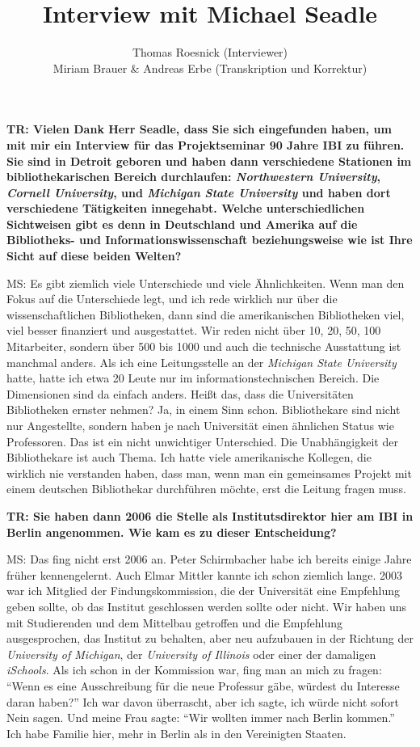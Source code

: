 \documentclass[a4paper,
fontsize=11pt,
oneside,
numbers=noperiodatend,
parskip=half-,
bibliography=totoc,
final
]{scrartcl}
\title{\LARGE{Interview mit Michael Seadle}}%
\author{Thomas Roesnick (Interviewer) \\ Miriam Brauer \& Andreas Erbe (Transkription und Korrektur)} %
\date{}
\begin{document}
\maketitle
\thispagestyle{fancyplain} 


\textbf{TR: Vielen Dank Herr Seadle, dass Sie sich eingefunden haben, um
mit mir ein Interview für das Projektseminar 90 Jahre IBI zu führen. Sie
sind in Detroit geboren und haben dann verschiedene Stationen im
bibliothekarischen Bereich durchlaufen: \emph{Northwestern University},
\emph{Cornell University}, und \emph{Michigan State University} und
haben dort verschiedene Tätigkeiten innegehabt. Welche unterschiedlichen
Sichtweisen gibt es denn in Deutschland und Amerika auf die Bibliotheks-
und Informationswissenschaft beziehungsweise wie ist Ihre Sicht auf
diese beiden Welten?}

MS: Es gibt ziemlich viele Unterschiede und viele Ähnlichkeiten. Wenn
man den Fokus auf die Unterschiede legt, und ich rede wirklich nur über
die wissenschaftlichen Bibliotheken, dann sind die amerikanischen
Bibliotheken viel, viel besser finanziert und ausgestattet. Wir reden
nicht über 10, 20, 50, 100 Mitarbeiter, sondern über 500 bis 1000 und
auch die technische Ausstattung ist manchmal anders. Als ich eine
Leitungsstelle an der \emph{Michigan State University} hatte, hatte ich
etwa 20 Leute nur im informationstechnischen Bereich. Die Dimensionen
sind da einfach anders. Heißt das, dass die Universitäten Bibliotheken
ernster nehmen? Ja, in einem Sinn schon. Bibliothekare sind nicht nur
Angestellte, sondern haben je nach Universität einen ähnlichen Status
wie Professoren. Das ist ein nicht unwichtiger Unterschied. Die
Unabhängigkeit der Bibliothekare ist auch Thema. Ich hatte viele
amerikanische Kollegen, die wirklich nie verstanden haben, dass man,
wenn man ein gemeinsames Projekt mit einem deutschen Bibliothekar
durchführen möchte, erst die Leitung fragen muss.

\textbf{TR: Sie haben dann 2006 die Stelle als Institutsdirektor hier am
IBI in Berlin angenommen. Wie kam es zu dieser Entscheidung?}

MS: Das fing nicht erst 2006 an. Peter Schirmbacher habe ich bereits
einige Jahre früher kennengelernt. Auch Elmar Mittler kannte ich schon
ziemlich lange. 2003 war ich Mitglied der Findungskommission, die der
Universität eine Empfehlung geben sollte, ob das Institut geschlossen
werden sollte oder nicht. Wir haben uns mit Studierenden und dem
Mittelbau getroffen und die Empfehlung ausgesprochen, das Institut zu
behalten, aber neu aufzubauen in der Richtung der \emph{University of
Michigan}, der \emph{University of Illinois} oder einer der damaligen
\emph{iSchools}. Als ich schon in der Kommission war, fing man an mich
zu fragen: \enquote{Wenn es eine Ausschreibung für die neue Professur
gäbe, würdest du Interesse daran haben?} Ich war davon überrascht, aber
ich sagte, ich würde nicht sofort Nein sagen. Und meine Frau sagte:
\enquote{Wir wollten immer nach Berlin kommen.} Ich habe Familie hier,
mehr in Berlin als in den Vereinigten Staaten.
\end{document}
